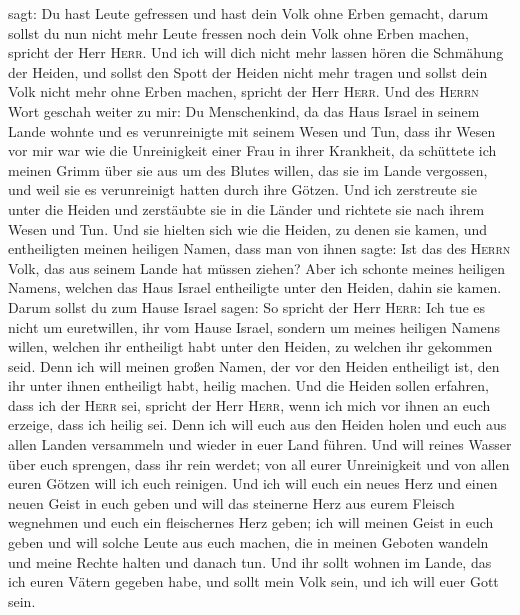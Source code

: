 sagt: Du hast Leute gefressen und hast dein Volk ohne Erben gemacht,
 darum sollst du nun nicht mehr Leute fressen noch dein
Volk ohne Erben machen, spricht der Herr \textsc{Herr}. 
Und ich will dich nicht mehr lassen hören die Schmähung der Heiden, und
sollst den Spott der Heiden nicht mehr tragen und sollst dein Volk nicht
mehr ohne Erben machen, spricht der Herr \textsc{Herr}. 
Und des \textsc{Herrn} Wort geschah weiter zu mir:  Du
Menschenkind, da das Haus Israel in seinem Lande wohnte und es
verunreinigte mit seinem Wesen und Tun, dass ihr Wesen vor mir war wie
die Unreinigkeit einer Frau in ihrer Krankheit,  da
schüttete ich meinen Grimm über sie aus um des Blutes willen, das sie im
Lande vergossen, und weil sie es verunreinigt hatten durch ihre Götzen.
 Und ich zerstreute sie unter die Heiden und zerstäubte
sie in die Länder und richtete sie nach ihrem Wesen und Tun.
 Und sie hielten sich wie die Heiden, zu denen sie kamen,
und entheiligten meinen heiligen Namen, dass man von ihnen sagte: Ist
das des \textsc{Herrn} Volk, das aus seinem Lande hat müssen ziehen?
 Aber ich schonte meines heiligen Namens, welchen das
Haus Israel entheiligte unter den Heiden, dahin sie kamen.
 Darum sollst du zum Hause Israel sagen: So spricht der
Herr \textsc{Herr}: Ich tue es nicht um euretwillen, ihr vom Hause
Israel, sondern um meines heiligen Namens willen, welchen ihr entheiligt
habt unter den Heiden, zu welchen ihr gekommen seid. 
Denn ich will meinen großen Namen, der vor den Heiden entheiligt ist,
den ihr unter ihnen entheiligt habt, heilig machen. Und die Heiden
sollen erfahren, dass ich der \textsc{Herr} sei, spricht der Herr
\textsc{Herr}, wenn ich mich vor ihnen an euch erzeige, dass ich heilig
sei.  Denn ich will euch aus den Heiden holen und euch
aus allen Landen versammeln und wieder in euer Land führen.
 Und will reines Wasser über euch sprengen, dass ihr rein
werdet; von all eurer Unreinigkeit und von allen euren Götzen will ich
euch reinigen.  Und ich will euch ein neues Herz und
einen neuen Geist in euch geben und will das steinerne Herz aus eurem
Fleisch wegnehmen und euch ein fleischernes Herz geben; 
ich will meinen Geist in euch geben und will solche Leute aus euch
machen, die in meinen Geboten wandeln und meine Rechte halten und danach
tun.  Und ihr sollt wohnen im Lande, das ich euren Vätern
gegeben habe, und sollt mein Volk sein, und ich will euer Gott sein.
